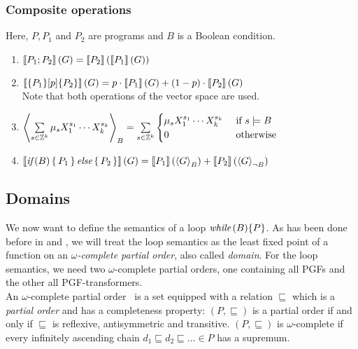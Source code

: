 \subsubsection*{Composite operations}
Here, $P, P_1$ and $P_2$ are programs and $B$ is a Boolean condition.
\begin{enumerate}
	\item $\left\llbracket P_1; P_2 \right\rrbracket(G) = \left\llbracket P_2 \right\rrbracket( \left\llbracket P_1 \right\rrbracket(G) )$
	\item $\left\llbracket  \{P_1\}[p]\{P_2\}  \right\rrbracket(G)
		= p \cdot \left\llbracket P_1 \right\rrbracket(G) + (1-p) \cdot \left\llbracket P_2 \right\rrbracket(G)$ \\
		Note that both operations of the vector space are used.
	\item $\left\langle \sum\limits_{s \in \mathbb{Z}^k} \mu_s X_1^{s_1} \cdots X_k^{s_k} \right\rangle_{B} =
		\sum\limits_{s \in \mathbb{Z}^k}\begin{cases}
		\mu_s X_1^{s_1} \cdots X_k^{s_k} & \text{ if } s \models B \\
		0 & \text{ otherwise}
	\end{cases}$
	\item $\left\llbracket \textit{if}\,(B) \, \{ \, P_1 \, \} \, \textit{else} \, \{ \, P_2 \, \} \right\rrbracket(G) = \left\llbracket P_1 \right\rrbracket(\left\langle G \right\rangle_{B}) + \left\llbracket P_2 \right\rrbracket(\left\langle G \right\rangle_{\lnot B})$
\end{enumerate}

\subsection{Domains}

We now want to define the semantics of a loop $\textit{while}\,(B) \{P\}$.
As has been done before in \cite{denHartog:verifying_prob_progs} and \cite{gretz:wp_semantics}, we will treat the loop semantics as the least fixed point of a function on an \emph{$\omega$-complete partial order}, also called \emph{domain}.
For the loop semantics, we need two $\omega$-complete partial orders, one containing all PGFs and the other all PGF-transformers. \\
An $\omega$-complete partial order~\cite{winskel:cpos} is a set equipped with a relation $\sqsubseteq$ which is a \emph{partial order} and has a completeness property:
$(P, \sqsubseteq)$ is a partial order if and only if $\sqsubseteq$ is reflexive, antisymmetric and transitive.
$(P, \sqsubseteq)$ is $\omega$-complete if every infinitely ascending chain $d_1 \sqsubseteq d_2 \sqsubseteq \ldots \in P$ has a supremum.


